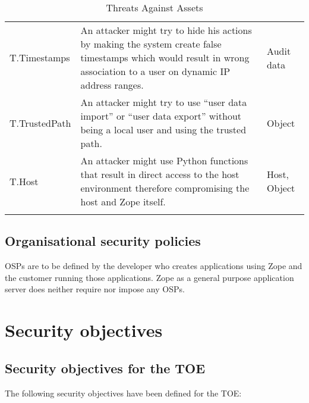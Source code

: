 \documentclass[12pt,english]{scrbook}
\begin{document}
\begin{longtable}[c]{lp{6cm}p{4cm}}
  T.Timestamps
   & 
  An attacker might try to hide his actions
  by making the system create false timestamps
  which would result in wrong association to a
  user on dynamic IP address ranges.
   & 
  Audit data
   \\
  

  T.TrustedPath
   & 
  An attacker might try to use ``user data import''
  or ``user data export'' without being a local
  user and using the trusted path.
   & 
  Object
   \\
  

  T.Host
   & 
  An attacker might use Python functions that
  result in direct access to the host environment
  therefore compromising the host and Zope itself.
   & 
  Host, Object
  \\
  \bottomrule
\caption{Threats Against Assets}
\label{tab-threats}
\end{longtable}
  





\section{Organisational security policies}

OSPs are to be defined by the developer who creates applications using Zope and
the customer running those applications.  Zope as a general purpose application
server does neither require nor impose any OSPs.





\chapter{Security objectives}





\section{Security objectives for the TOE}

The following security objectives have been defined for the TOE:
\end{document}
